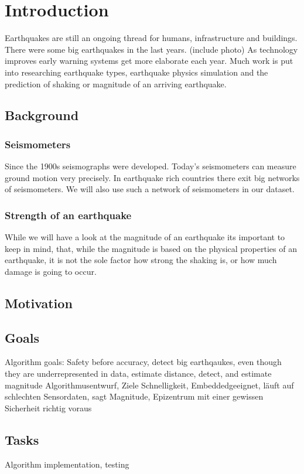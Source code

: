 \documentclass[thesis.tex]{subfiles}
\begin{document}
\chapter{Introduction}
\label{chap:introduction}
Earthquakes are still an ongoing thread for humans, infrastructure and buildings. There were some big earthquakes in the last years. (include photo) As technology improves early warning systems get more elaborate each year. Much work is put into researching earthquake types, earthquake physics simulation and the prediction of shaking or magnitude of an arriving earthquake. %

\section{Background}
\subsection{Seismometers}
Since the 1900s seismographs were developed. Today's seismometers can measure ground motion very precisely. In earthquake rich countries there exit big networks of seismometers. We will also use such a network of seismometers in our dataset.
\subsection{Strength of an earthquake}
While we will have a look at the magnitude of an earthquake its important to keep in mind, that, while the magnitude is based on the physical properties of an earthquake, it is not the sole factor how strong the shaking is, or how much damage is going to occur.                                                                              
\section{Motivation}

\section{Goals} \label{bib:goals}
Algorithm goals: Safety before accuracy, detect big earthqaukes, even though they are underrepresented in data, estimate distance, detect, and estimate magnitude
Algorithmusentwurf, Ziele Schnelligkeit, Embeddedgeeignet, läuft auf schlechten Sensordaten, sagt Magnitude, Epizentrum mit einer gewissen Sicherheit richtig voraus
\section{Tasks}
Algorithm implementation, testing
\end{document}
